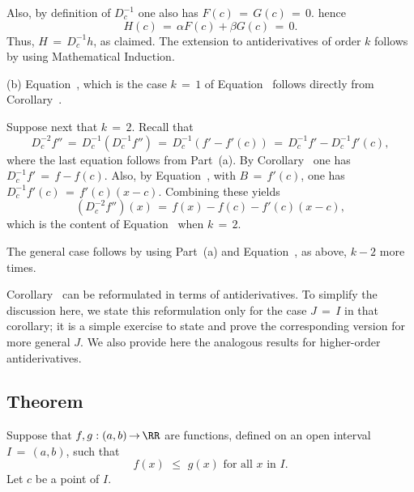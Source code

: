 {        Also, by definition of $D^{-1}_{c}$ one also has $F(c) \,=\, G(c) \,=\, 0$. hence
        \begin{displaymath}
        H(c) \,=\, {\alpha}F(c)+{\beta}G(c) \,=\, 0.
        \end{displaymath}
    Thus,  $H \,=\, D^{-1}_{c} h$, as claimed. The extension to antiderivatives of order $k$ follows by using Mathematical Induction.

\V

        (b) Equation~, which is the case $k \,=\, 1$ of Equation~ follows directly from Corollary~.

       Suppose next that $k \,=\, 2$.
    Recall that
        \begin{displaymath}
        D^{-2}_{c} f'' \,=\, D^{-1}_{c}\left(D^{-1}_{c} f''\right) \,=\, 
    D^{-1}_{c} \left(f' - f'(c)\right) \,=\, D^{-1}_{c} f' - D^{-1}_{c} f'(c),
        \end{displaymath}
    where the last equation follows from Part~(a).
    By Corollary~ one has $D^{-1}_{c} f' \,=\, f-f(c)$.
    Also, by Equation~, with $B \,=\, f'(c)$, one has $D^{-1}_{c} f'(c) \,=\, f'(c)(x-c)$.
    Combining these yields
        \begin{displaymath}
        \left(D^{-2}_{c} f''\right)(x) \,=\, f(x) - f(c) - f'(c)(x-c),
        \end{displaymath}
    which is the content of Equation~ when $k \,=\, 2$.

        The general case follows by using Part~(a) and Equation~, as above, $k-2$ more times. \Q

\V
\V

        Corollary~ can be reformulated in terms of antiderivatives.
    To simplify the discussion here, we state this reformulation only for the case $J \,=\, I$ in that corollary;
    it is a simple exercise to state and prove the corresponding version for more general $J$.
    We also provide here the analogous results for higher-order antiderivatives.


            \subsection{\small{\bf Theorem}}
            \label{ThmE45.110}


        Suppose that $f,g:(a,b) \,{\rightarrow}\, {\RR}$ are functions, defined on an open interval $I \,=\, (a,b)$, such that
        \begin{displaymath}
        f(x)\,\,{\leq}\,\,g(x) \mbox{ for all $x$ in $I$}.
        \end{displaymath}
    Let $c$ be a point of $I$.

}
